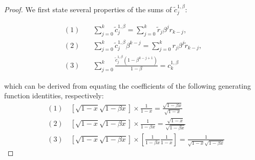 \documentclass{article} %
\begin{document}
\begin{proof}

We first state several properties of the sums of $\tilde{c}_{j}^{1, \beta}$:

\begin{equation}
\label{eq:properties_tildec}
\begin{split}
    (1) &\quad \sum\limits_{j =0}^{k} \tilde{c}^{1, \beta}_j = \sum\limits_{j = 0}^{k} \tilde{r}_{j}\beta^{j} r_{k - j}, \\ 
    (2) &\quad  \sum\limits_{j =0}^{k} \tilde{c}^{1, \beta}_j\beta^{k - j} = \sum\limits_{j = 0}^{k} r_{j}\beta^{j} \tilde{r}_{k - j}, \\
    (3) &\quad  \sum\limits_{j =0}^{k} \frac{\tilde{c}^{1, \beta}_j(1 - \beta^{k - j + 1})}{1 - \beta} = c_{k}^{1, \beta}
\end{split}
\end{equation}

which can be derived from equating the coefficients of the following generating function identities, respectively:
\begin{equation}
\begin{aligned}
    &(1)\quad \left[\sqrt{1 - x}\sqrt{1 - \beta x}\right] \times \frac{1}{1 -x} = \frac{\sqrt{ 1 - \beta x}}{\sqrt{1 - x}}\\
    &(2) \quad \left[\sqrt{1 - x}\sqrt{1 - \beta x}\right] \times \frac{1}{1 -\beta x} = \frac{\sqrt{ 1 - x}}{\sqrt{1 - \beta x}}\\
    &(3) \quad \left[\sqrt{1 - x}\sqrt{1 - \beta x}\right] \times \left[\frac{1}{1 -\beta x}\frac{1}{1 - x}\right] = \frac{1}{\sqrt{ 1 - x}\sqrt{1 - \beta x}}
\end{aligned}
\end{equation}

\end{proof}
\end{document}
